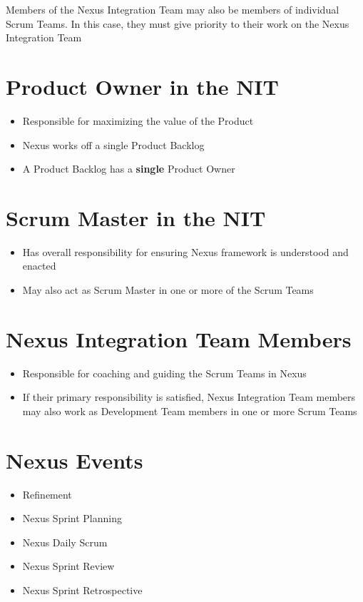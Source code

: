 \documentclass[a4paper,11pt,twocolumn]{article}
\begin{document}
\begin{tcolorbox}[colback=black!8!white,colframe=gray!50!black,title=Note,sharp corners,fonttitle=\normalsize\bfseries,fontupper=\normalsize]
	Members of the Nexus Integration Team may also be members of individual Scrum Teams. In this case, they must give priority to their work on the Nexus Integration Team
\end{tcolorbox}

\section*{Product Owner in the NIT}
\begin{itemize}
	\item Responsible for maximizing the value of the Product
	\item Nexus works off a single Product Backlog
	\item A Product Backlog has a \textbf{single} Product Owner
\end{itemize}

\section*{Scrum Master in the NIT}
\begin{itemize}
	\item Has overall responsibility for ensuring Nexus framework is understood and enacted
	\item May also act as Scrum Master in one or more of the Scrum Teams
\end{itemize}

\section*{Nexus Integration Team Members}
\begin{itemize}
	\item Responsible for coaching and guiding the Scrum Teams in Nexus
	\item If their primary responsibility is satisfied, Nexus Integration Team members may also work as Development Team members in one or more Scrum Teams
\end{itemize}

\section*{Nexus Events}
\begin{itemize}
	\item Refinement
	\item Nexus Sprint Planning
	\item Nexus Daily Scrum
	\item Nexus Sprint Review
	\item Nexus Sprint Retrospective
\end{itemize}
\end{document}
